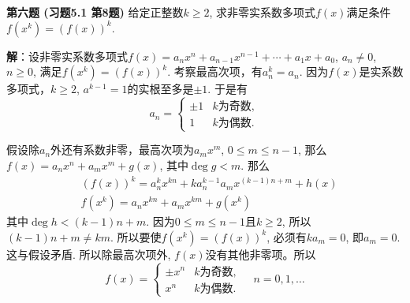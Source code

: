 \fi  %

\newpageorvspace

{\bf 第六题 (习题5.1 第8题)} 给定正整数$k\geqslant 2$, 求非零实系数多项式$f(x)$满足条件$f(x^k) = (f(x))^k$.

\ifIncludeAnswer

\newpageorvspace

{\bf 解}：设非零实系数多项式$f(x) = a_nx^n + a_{n-1}x^{n-1} + \cdots + a_1x + a_0$, $a_n\neq 0$, $n\geqslant 0$, 满足$f(x^k) = (f(x))^k$. 考察最高次项，有$a_n^k = a_n$. 因为$f(x)$是实系数多项式，$k\geqslant 2$, $a^{k-1} = 1$的实根至多是$\pm 1.$ 于是有
$$a_n = \begin{cases}\pm 1 & \text{$k$为奇数}, \\ 1 & \text{$k$为偶数}. \end{cases}$$

假设除$a_n$外还有系数非零，最高次项为$a_mx^m$, $0 \leqslant m \leqslant n-1$, 那么$f(x) = a_nx^n + a_mx^m + g(x)$, 其中$\deg g < m$. 那么
\begin{align*}
& (f(x))^k = a_n^kx^{kn} + ka_n^{k-1}a_mx^{(k-1)n+m} + h(x) \\
& f(x^k) = a_nx^{kn} + a_mx^{km} + g(x^k)
\end{align*}
其中$\deg h < (k-1)n+m$. 因为$0 \leqslant m \leqslant n-1$且$k\geqslant 2$, 所以$(k-1)n+m \neq km$. 所以要使$f(x^k) = (f(x))^k$, 必须有$ka_m = 0$, 即$a_m = 0$. 这与假设矛盾. 所以除最高次项外, $f(x)$没有其他非零项。所以
$$f(x) = \begin{cases}\pm x^n & \text{$k$为奇数}, \\ x^n & \text{$k$为偶数}. \end{cases} \quad n = 0, 1, \ldots$$

\fi  %


